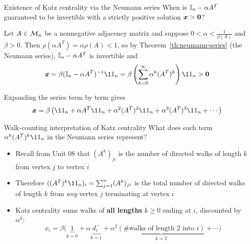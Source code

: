 \documentclass[aspectratio=169]{beamer}\usepackage[]{graphicx}\usepackage[]{xcolor}
\begin{document}
\begin{frame}{Existence of Katz centrality via the Neumann series}
When is $\mathbb{I}_n - \alpha A^T$ guaranteed to be invertible with a strictly positive solution $\bx > \b0$?
\vfill
\begin{theorem}
Let $A \in \mathcal{M}_n$ be a nonnegative adjacency matrix and suppose $0 < \alpha < \frac{1}{\rho(A)}$ and $\beta > 0$. Then $\rho(\alpha A^T) = \alpha \rho(A) < 1$, so by Theorem~\ref{th:neumann-series} (the Neumann series), $\mathbb{I}_n - \alpha A^T$ is invertible and
\[
\bx = \beta (\II_n - \alpha A^T)^{-1} \11_n = \beta \left(\sum_{k=0}^\infty \alpha^k (A^T)^k\right) \11_n > \b0
\]
\end{theorem}
\vfill
Expanding the series term by term gives
\[
\bx = \beta \left(\11_n + \alpha A^T \11_n + \alpha^2 (A^T)^2 \11_n + \alpha^3 (A^T)^3 \11_n + \cdots\right)
\]
\end{frame}

\begin{frame}{Walk-counting interpretation of Katz centrality}
What does each term $\alpha^k (A^T)^k \11_n$ in the Neumann series represent?
\vfill
\begin{itemize}
\item Recall from Unit 08 that $(A^k)_{ji}$ is the number of directed walks of length $k$ from vertex $j$ to vertex $i$
\vfill
\item Therefore $((A^T)^k \11_n)_i = \sum_{j=1}^n (A^k)_{ji}$ is the total number of directed walks of length $k$ from \emph{any} vertex $j$ terminating at vertex $i$
\vfill
\item Katz centrality sums walks of \textbf{all lengths} $k \ge 0$ ending at $i$, discounted by $\alpha^k$:
\[
x_i = \beta \big(\underbrace{1}_{k=0} + \alpha \underbrace{d_i^-}_{k=1} + \alpha^2 \underbrace{(\text{\# walks of length } 2 \text{ into } i)}_{k=2} + \cdots\big)
\]
\end{itemize}
\end{frame}
\end{document}
